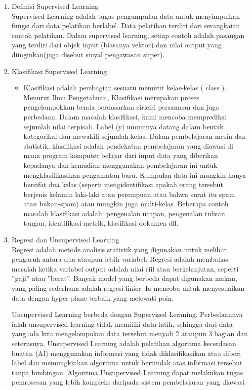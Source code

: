\begin{enumerate}
\item Definisi Supervised Learning\\
Supervised Learning adalah tugas pengumpulan data untuk menyimpulkan fungsi dari data pelatihan berlabel. Data pelatihan terdiri dari serangkaian contoh pelatihan. Dalam supervised learning, setiap contoh adalah pasangan yang terdiri dari objek input (biasanya vektor) dan nilai output yang diinginkan(juga disebut sinyal pengawasan super).

\item Klasifikasi Supervised Learning
\begin{itemize}
\item Klasifikasi adalah pembagian sesuatu menurut kelas-kelas ( class ). Menurut Ilmu Pengetahuan, Klasifikasi merupakan proses pengelompokkan benda berdasarkan ciriciri persamaan dan juga perbedaan. Dalam masalah klasifikasi, kami mencoba memprediksi sejumlah nilai terpisah. Label (y) umumnya datang dalam bentuk kategorikal dan mewakili sejumlah kelas. Dalam pembelajaran mesin dan statistik, klasifikasi adalah pendekatan pembelajaran yang diawasi di mana program komputer belajar dari input data yang diberikan kepadanya dan kemudian menggunakan pembelajaran ini untuk mengklasifikasikan pengamatan baru. Kumpulan data ini mungkin hanya bersifat dua kelas (seperti mengidentifikasi apakah orang tersebut berjenis kelamin laki-laki atau perempuan atau bahwa surat itu spam atau bukan-spam) atau mungkin juga multi-kelas. Beberapa contoh masalah klasifikasi adalah: pengenalan ucapan, pengenalan tulisan tangan, identifikasi metrik, klasifikasi dokumen dll.
\end{itemize}

\item Regresi dan Unsupervised Learning\\
Regresi adalah metode analisis statistik yang digunakan untuk melihat pengaruh antara dua ataupun lebih variabel. Regresi adalah membahas masalah ketika variabel output adalah nilai riil atau berkelanjutan, seperti ”gaji” atau ”berat”. Banyak model yang berbeda dapat digunakan makan, yang paling sederhana adalah regresi linier. Ia mencoba untuk menyesuaikan data dengan hyper-plane terbaik yang melewati poin.

Unsupervised Learning berbeda dengan Supervised Leraning. Perbedaannya ialah unsupervised learning tidak memiliki data latih, sehingga dari data yang ada kita mengelompokan data tersebut menjadi 2 ataupun 3 bagian dan seterusnya. Unsupervised Learning adalah pelatihan algoritma kecerdasan buatan (AI) menggunakan informasi yang tidak diklasifikasikan atau diberi label dan memungkinkan algoritma untuk bertindak atas informasi tersebut tanpa bimbingan. Algoritma Unsupervised Learning dapat melakukan tugas pemrosesan yang lebih kompleks daripada sistem pembelajaran yang diawasi


\end{enumerate}
